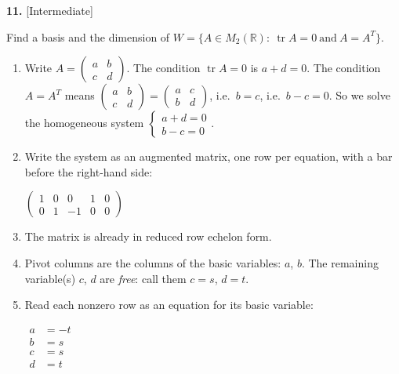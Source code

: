\documentclass[11pt]{article}
\begin{document}
\par\vspace{2pt}
\begin{minipage}{\linewidth}\textbf{11.} \hfill{\scriptsize\color{ink}[Intermediate]}\par\nopagebreak Find a basis and the dimension of $W=\{A\in M_2(\mathbb{R}):\ \operatorname{tr}A=0\ \text{and}\ A=A^{T}\}$.
\end{minipage}\par\nopagebreak
\begin{tcolorbox}[breakable,colback=ans,colframe=ansb,boxrule=0.5pt,left=4pt,right=4pt,top=2pt,bottom=2pt]\begin{enumerate}[leftmargin=3.1em,itemsep=1pt,topsep=1pt,label=\textbf{Step \arabic*.}]\item Write $A=\begin{pmatrix}a&b\\c&d\end{pmatrix}$. The condition $\operatorname{tr}A=0$ is $a+d=0$. The condition $A=A^{T}$ means $\begin{pmatrix}a&b\\c&d\end{pmatrix}=\begin{pmatrix}a&c\\b&d\end{pmatrix}$, i.e.\ $b=c$, i.e.\ $b-c=0$. So we solve the homogeneous system $\begin{cases}a+d=0\\ b-c=0\end{cases}$.
\item Write the system as an augmented matrix, one row per equation, with a bar before the right-hand side:\par\smallskip $\displaystyle \left(\begin{array}{cccc|c}1 & 0 & 0 & 1 & 0 \\ 0 & 1 & -1 & 0 & 0\end{array}\right)$
\item The matrix is already in reduced row echelon form.
\item Pivot columns are the columns of the basic variables: $a$, $b$. The remaining variable(s) $c$, $d$ are \emph{free}: call them $c=s$, $d=t$.
\item Read each nonzero row as an equation for its basic variable:\par\smallskip $\displaystyle\begin{aligned}a&=-t\\ b&=s\\ c&=s\\ d&=t\end{aligned}$

\end{enumerate}
\end{tcolorbox}
\end{document}
